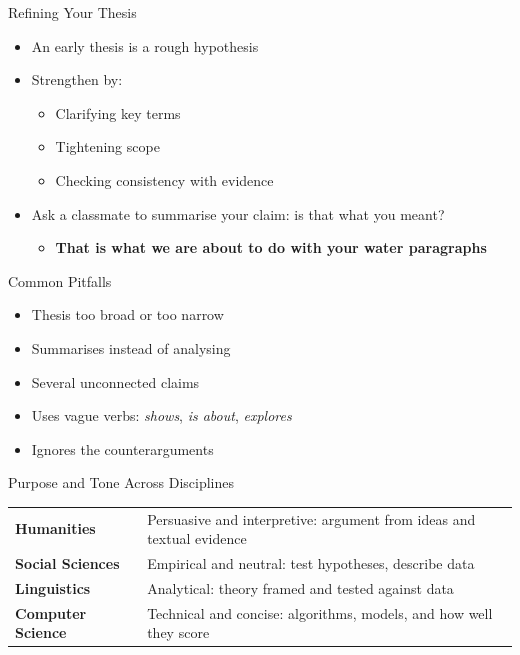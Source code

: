 \documentclass[aspectratio=169]{beamer}
\begin{document}
\begin{frame}{Refining Your Thesis}
\begin{itemize}
  \item An early thesis is a rough hypothesis
  \item Strengthen by:
    \begin{itemize}
      \item Clarifying key terms
      \item Tightening scope
      \item Checking consistency with evidence
    \end{itemize}
  \item Ask a classmate to summarise your claim: is that what you meant?
    \begin{itemize}
    \item \textbf{That is what we are about to do with your water paragraphs}
    \end{itemize}
\end{itemize}
\end{frame}


\begin{frame}{Common Pitfalls}
\begin{itemize}
  \item Thesis too broad or too narrow
  \item Summarises instead of analysing
  \item Several unconnected claims
  \item Uses vague verbs: \textit{shows}, \textit{is about}, \textit{explores}
  \item Ignores the counterarguments
\end{itemize}
\end{frame}



\begin{frame}{Purpose and Tone Across Disciplines}
\begin{tabular}{p{3cm}p{7cm}}
\textbf{Humanities} & Persuasive and interpretive: argument from ideas and textual evidence \\[0.5em]
\textbf{Social Sciences} & Empirical and neutral: test hypotheses, describe data \\[0.5em]
\textbf{Linguistics} & Analytical: theory framed and tested against data \\[0.5em]
\textbf{Computer Science} & Technical and concise: algorithms, models, and how well they score
\end{tabular}
\end{frame}
\end{document}
